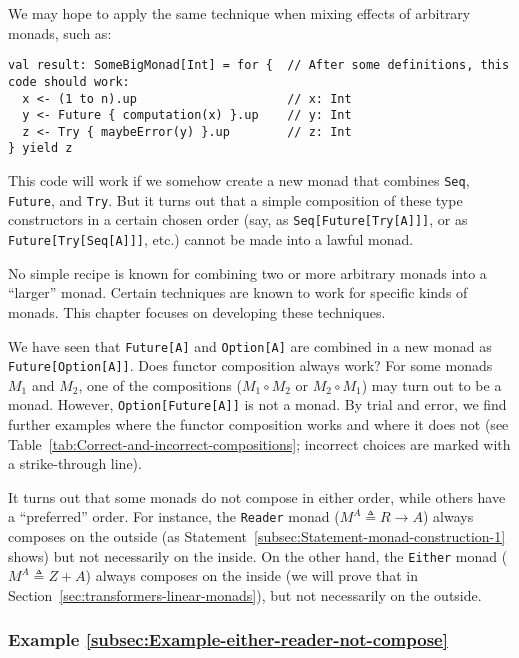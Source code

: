 We may hope to apply the same technique when mixing effects of arbitrary
monads, such as:
\begin{lstlisting}
val result: SomeBigMonad[Int] = for {  // After some definitions, this code should work:
  x <- (1 to n).up                     // x: Int
  y <- Future { computation(x) }.up    // y: Int
  z <- Try { maybeError(y) }.up        // z: Int
} yield z
\end{lstlisting}
This code will work if we somehow create a new monad that combines
\lstinline!Seq!, \lstinline!Future!, and \lstinline!Try!. But it
turns out that a simple composition of these type constructors in
a certain chosen order (say, as \lstinline!Seq[Future[Try[A]]]!,
or as \lstinline!Future[Try[Seq[A]]]!, etc.) cannot be made into
a lawful monad.

No simple recipe is known for combining two or more arbitrary monads
into a \textsf{``}larger\textsf{''} monad. Certain techniques are known to work for
specific kinds of monads. This chapter focuses on developing these
techniques.

We have seen that \lstinline!Future[A]! and \lstinline!Option[A]!
are combined in a new monad as \lstinline!Future[Option[A]]!. Does
functor composition always work? For some monads $M_{1}$ and $M_{2}$,
one of the compositions ($M_{1}\circ M_{2}$ or $M_{2}\circ M_{1}$)
may turn out to be a monad. However, \lstinline!Option[Future[A]]!
is not a monad. By trial and error, we find further examples where
the functor composition works and where it does not (see Table~\ref{tab:Correct-and-incorrect-compositions};
incorrect choices are marked with a strike-through line).

It turns out that some monads do not compose in either order, while
others have a \textsf{``}preferred\textsf{''} order. For instance, the \lstinline!Reader!
monad ($M^{A}\triangleq R\rightarrow A$) always composes on the outside
(as Statement~\ref{subsec:Statement-monad-construction-1} shows)
but not necessarily on the inside. On the other hand, the \lstinline!Either!
monad ($M^{A}\triangleq Z+A$) always composes on the inside (we will
prove that in Section~\ref{sec:transformers-linear-monads}), but
not necessarily on the outside.

\subsubsection{Example \label{subsec:Example-either-reader-not-compose}\ref{subsec:Example-either-reader-not-compose}}

